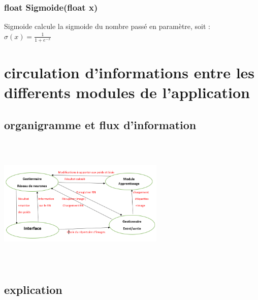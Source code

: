 \documentclass{article}
\begin{document}
		\subsubsection{\textcolor{myblue}{\textbf{float}} Sigmoide(\textcolor{myblue}{\textbf{float}} x)}
		Sigmoide calcule la sigmoide du nombre passé en paramètre, soit : \\
		$\sigma(x) = \frac{1}{1+e^{-x}}$
	\newpage

\section{circulation d'informations entre les differents modules de l'application}
	\subsection{organigramme et flux d'information}
		\begin{center} 

			\includegraphics[height=244, width=300]{pic-min.PNG}

		\end{center}	
	\subsection{explication}
		
\end{document}
